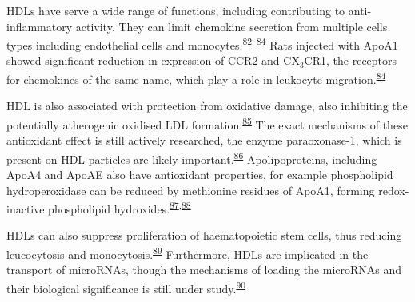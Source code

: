 \documentclass[
]{article}
\begin{document}
HDLs have serve a wide range of functions, including contributing to anti-inflammatory activity.
They can limit chemokine secretion from multiple cells types including endothelial cells and monocytes.\textsuperscript{\protect\hyperlink{ref-cockerill_gillian_w_high-density_1995}{82}--\protect\hyperlink{ref-bursill_christina_a_high-density_2010}{84}}
Rats injected with ApoA1 showed significant reduction in expression of CCR2 and CX\(_3\)CR1, the receptors for chemokines of the same name, which play a role in leukocyte migration.\textsuperscript{\protect\hyperlink{ref-bursill_christina_a_high-density_2010}{84}}

HDL is also associated with protection from oxidative damage, also inhibiting the potentially atherogenic oxidised LDL formation.\textsuperscript{\protect\hyperlink{ref-anatol_small_2003}{85}}
The exact mechanisms of these antioxidant effect is still actively researched, the enzyme paraoxonase-1, which is present on HDL particles are likely important.\textsuperscript{\protect\hyperlink{ref-mackness_role_2004}{86}}
Apolipoproteins, including ApoA4 and ApoAE also have antioxidant properties, for example phospholipid hydroperoxidase can be reduced by methionine residues of ApoA1, forming redox-inactive phospholipid hydroxides.\textsuperscript{\protect\hyperlink{ref-christison_exchange_1995}{87},\protect\hyperlink{ref-zerrad-saadi_amal_hdl3-mediated_2009}{88}}

HDLs can also suppress proliferation of haematopoietic stem cells, thus reducing leucocytosis and monocytosis.\textsuperscript{\protect\hyperlink{ref-yvan-charvet_atp-binding_2010}{89}}
Furthermore, HDLs are implicated in the transport of microRNAs, though the mechanisms of loading the microRNAs and their biological significance is still under study.\textsuperscript{\protect\hyperlink{ref-vickers_micrornas_2011}{90}}
\end{document}
